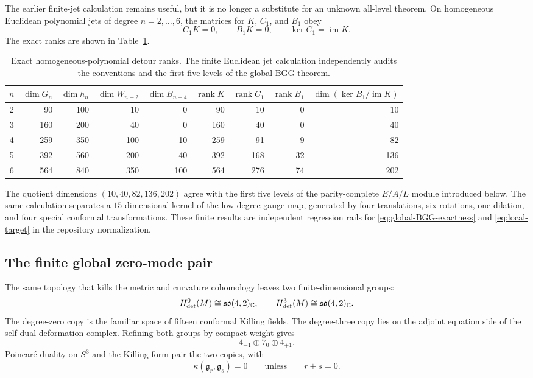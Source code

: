\documentclass[11pt]{article}
\theoremstyle{definition}
\theoremstyle{remark}
\newcommand{\C}{\mathbb C}
\newcommand{\g}{\mathfrak g}
\newcommand{\im}{\operatorname{im}}
\newcommand{\rank}{\operatorname{rank}}
\begin{document}
The earlier finite-jet calculation remains useful, but it is no longer a
substitute for an unknown all-level theorem.  On homogeneous Euclidean
polynomial jets of degree $n=2,\ldots,6$, the matrices for $K$, $C_1$, and
$B_1$ obey
\begin{equation}
 C_1K=0,
 \qquad B_1K=0,
 \qquad \ker C_1=\im K.
\end{equation}
The exact ranks are shown in Table~\ref{tab:detour-ranks}.

\begin{table}[ht]
\centering
\small
\begin{tabular}{c@{\quad}rrrrrrrr}
\toprule
$n$ & $\dim G_n$ & $\dim h_n$ & $\dim W_{n-2}$ & $\dim B_{n-4}$
& $\rank K$ & $\rank C_1$ & $\rank B_1$
& $\dim(\ker B_1/\im K)$\\
\midrule
2 & 90  & 100 & 10  & 0   & 90  & 10  & 0  & 10\\
3 & 160 & 200 & 40  & 0   & 160 & 40  & 0  & 40\\
4 & 259 & 350 & 100 & 10  & 259 & 91  & 9  & 82\\
5 & 392 & 560 & 200 & 40  & 392 & 168 & 32 & 136\\
6 & 564 & 840 & 350 & 100 & 564 & 276 & 74 & 202\\
\bottomrule
\end{tabular}
\caption{Exact homogeneous-polynomial detour ranks.  The finite Euclidean
jet calculation independently audits the conventions and the first five
levels of the global BGG theorem.}
\label{tab:detour-ranks}
\end{table}

The quotient dimensions $(10,40,82,136,202)$ agree with the first five
levels of the parity-complete $E/A/L$ module introduced below.  The same
calculation separates a $15$-dimensional kernel of the low-degree gauge map,
generated by four translations, six rotations, one dilation, and four
special conformal transformations.  These finite results are independent
regression rails for \eqref{eq:global-BGG-exactness} and
\eqref{eq:local-target} in the repository normalization.

\subsection{The finite global zero-mode pair}

The same topology that kills the metric and curvature cohomology leaves two
finite-dimensional groups:
\begin{equation}\label{eq:BGG-zero-mode-pair}
 H^0_{\rm def}(M)\cong\mathfrak{so}(4,2)_\C,
 \qquad
 H^3_{\rm def}(M)\cong\mathfrak{so}(4,2)_\C.
\end{equation}
The degree-zero copy is the familiar space of fifteen conformal Killing
fields.  The degree-three copy lies on the adjoint equation side of the
self-dual deformation complex.  Refining both groups by compact weight gives
\begin{equation}
 4_{-1}\oplus7_0\oplus4_{+1}.
\end{equation}
Poincar\'e duality on $S^3$ and the Killing form pair the two copies, with
\begin{equation}
 \kappa(\g_r,\g_s)=0\qquad\text{unless}\qquad r+s=0.
\end{equation}
\end{document}
